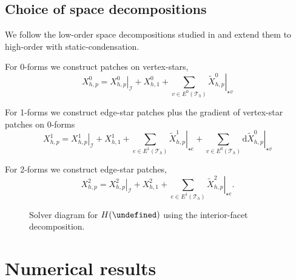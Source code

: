 \documentclass[review,onefignum,onetabnum,a4paper]{siamart190516}
\let\grad\undefined
\DeclareMathOperator{\grad}{grad}
\newcommand{\Hgrad}{H(\grad)}
\newcommand{\mesh}{\mathcal{T}_h}
\begin{document}
\subsection{Choice of space decompositions}
We follow 
the low-order space decompositions studied in \cite{arnold00}
and extend them to high-order with static-condensation.

For 0-forms we construct patches on vertex-stars,
\begin{equation}
   X^0_{h,p} = \left.X^0_{h,p}\right|_\mathcal{I} + X^0_{h,1} 
   + \sum_{v\in E^0(\mesh)} \left.\tilde{X}^0_{h,p}\right|_{\star v} 
\end{equation}

For 1-forms we construct edge-star patches
plus the gradient of vertex-star patches on 0-forms
\begin{equation}
   X^1_{h,p} = \left.X^1_{h,p}\right|_\mathcal{I} +  X^1_{h,1}
   + \sum_{e\in E^1(\mesh)} \left.\tilde{X}^1_{h,p}\right|_{\star e} 
   + \sum_{v\in E^0(\mesh)} \mathrm{d} \left.\tilde{X}^0_{h,p}\right|_{\star v} 
\end{equation}

For 2-forms we construct edge-star patches,
\begin{equation}
   X^2_{h,p} = \left.X^2_{h,p}\right|_\mathcal{I} +  X^2_{h,1} 
   + \sum_{e\in E^1(\mesh)} \left.\tilde{X}^2_{h,p}\right|_{\star e}. 
\end{equation}



\begin{figure}[htbp]
\footnotesize
\centering
{}
\caption{Solver diagram for $\Hgrad$ using the interior-facet decomposition.}
\end{figure}


\section{Numerical results} \label{sec:results}
\end{document}

